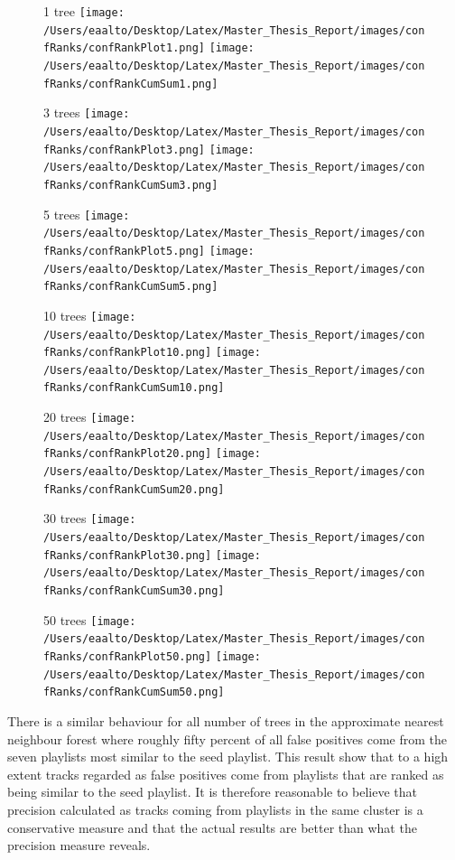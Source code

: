 \documentclass[a4paper,11pt]{kth-mag}
\begin{document}
\begin{figure}
1 tree
\texttt{[image: /Users/eaalto/Desktop/Latex/Master\_Thesis\_Report/images/confRanks/confRankPlot1.png]}
\texttt{[image: /Users/eaalto/Desktop/Latex/Master\_Thesis\_Report/images/confRanks/confRankCumSum1.png]}
\end{figure}

\begin{figure}
3 trees
\texttt{[image: /Users/eaalto/Desktop/Latex/Master\_Thesis\_Report/images/confRanks/confRankPlot3.png]}
\texttt{[image: /Users/eaalto/Desktop/Latex/Master\_Thesis\_Report/images/confRanks/confRankCumSum3.png]}
\end{figure}

\begin{figure}
5 trees
\texttt{[image: /Users/eaalto/Desktop/Latex/Master\_Thesis\_Report/images/confRanks/confRankPlot5.png]}
\texttt{[image: /Users/eaalto/Desktop/Latex/Master\_Thesis\_Report/images/confRanks/confRankCumSum5.png]}
\end{figure}

\begin{figure}
10 trees
\texttt{[image: /Users/eaalto/Desktop/Latex/Master\_Thesis\_Report/images/confRanks/confRankPlot10.png]}
\texttt{[image: /Users/eaalto/Desktop/Latex/Master\_Thesis\_Report/images/confRanks/confRankCumSum10.png]}
\end{figure}

\begin{figure}
20 trees
\texttt{[image: /Users/eaalto/Desktop/Latex/Master\_Thesis\_Report/images/confRanks/confRankPlot20.png]}
\texttt{[image: /Users/eaalto/Desktop/Latex/Master\_Thesis\_Report/images/confRanks/confRankCumSum20.png]}
\end{figure}

\begin{figure}
30 trees
\texttt{[image: /Users/eaalto/Desktop/Latex/Master\_Thesis\_Report/images/confRanks/confRankPlot30.png]}
\texttt{[image: /Users/eaalto/Desktop/Latex/Master\_Thesis\_Report/images/confRanks/confRankCumSum30.png]}
\end{figure}

\begin{figure}
50 trees
\texttt{[image: /Users/eaalto/Desktop/Latex/Master\_Thesis\_Report/images/confRanks/confRankPlot50.png]}
\texttt{[image: /Users/eaalto/Desktop/Latex/Master\_Thesis\_Report/images/confRanks/confRankCumSum50.png]}
\end{figure}

There is a similar behaviour for all number of trees in the approximate nearest neighbour forest where roughly fifty percent of all false positives come from the seven playlists most similar to the seed playlist. This result show that to a high extent tracks regarded as false positives come from playlists that are ranked as being similar to the seed playlist. It is therefore reasonable to believe that precision calculated as tracks coming from playlists in the same cluster is a conservative measure and that the actual results are better than what the precision measure reveals.
\end{document}
